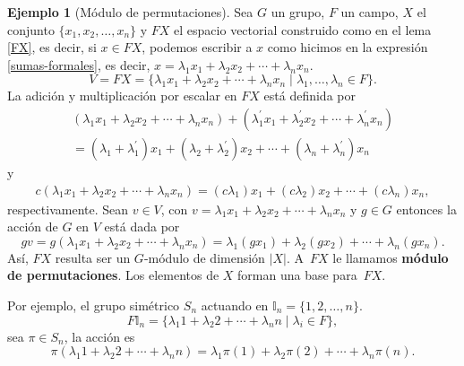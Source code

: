 \documentclass[12pt]{book}
\theoremstyle{definition}
\newtheorem{example}[theorem]{Ejemplo}
\newcounter{in}
\newcounter{ini}
\begin{document}
\begin{example}[Módulo de permutaciones]
  \label{CS}
  Sea $G$ un grupo, $F$ un campo, $X$ el conjunto $\{x_{1},x_{2},\ldots,x_{n}\}$ y $FX$ el
  espacio vectorial construido como en el lema \ref{FX}, es decir,
  si $x\in FX$, podemos escribir a $x$ como hicimos en la expresión
\ref{sumas-formales}, es decir,
$x=\lambda_{1}x_{1}+\lambda_{2}x_{2}+\cdots+\lambda_{n}x_{n}$.
  \begin{equation*}
    V=FX=\{\lambda_{1}x_{1}+\lambda_{2}x_{2}+\cdots
    +\lambda_{n}x_{n}\mid\lambda_{1},\ldots,\lambda_{n}\in F\}.
  \end{equation*}
  La adición y multiplicación por escalar
  en $FX$ está definida por
  \begin{eqnarray*}
    (\lambda_{1}x_{1}+\lambda_{2}x_{2}+\cdots
    +\lambda_{n}x_{n})+(\lambda^{'}_{1}x_{1}+\lambda^{'}_{2}x_{2}+\cdots +\lambda^{'}_{n}x_{n})\\
    =(\lambda_{1}+\lambda^{'}_{1})x_{1}+(\lambda_{2}+\lambda^{'}_{2})x_{2}+\cdots
    +(\lambda_{n}+\lambda^{'}_{n})x_{n}
  \end{eqnarray*}
  y
  \begin{eqnarray*}
    c(\lambda_{1}x_{1}+\lambda_{2}x_{2}+\cdots +\lambda_{n}x_{n})=(c\lambda_{1})x_{1}+(c\lambda_{2})x_{2}+\cdots +(c\lambda_{n})x_{n},
  \end{eqnarray*}
  respectivamente. Sean $v\in V$, con
  $v=\lambda_{1}x_{1}+\lambda_{2}x_{2}+\cdots+\lambda_{n}x_{n}$ y
  $g\in G$ entonces la acción de $G$ en $V$ está dada por
  \begin{equation*}
    gv=g(\lambda_{1}x_{1}+\lambda_{2}x_{2}+\cdots +\lambda_{n}x_{n})=\lambda_{1}(gx_{1})+\lambda_{2}(gx_{2})+\cdots +\lambda_{n}(gx_{n}).
  \end{equation*}
  Así, $FX$ resulta ser un $G$-módulo de dimensión $|X|$. A~$FX$ le llamamos
  \textbf{módulo de permutaciones}. Los elementos de $X$ forman una base para~$FX$.

  Por ejemplo, el grupo simétrico $S_{n}$ actuando en $\mathbb{I}_{n}=\{1,2,\ldots,n\}$.
  \begin{equation*}
    F\mathbb{I}_{n}=\{\lambda_{1}1+\lambda_{2}2+\cdots+\lambda_{n}n\mid
    \lambda_{i}\in F\},
  \end{equation*}
  sea $\pi\in S_{n}$, la acción es
  \begin{equation*}
    \pi(\lambda_{1}1+\lambda_{2}2+\cdots+\lambda_{n}n)=\lambda_{1}\pi(1)+\lambda_{2}\pi(2)+\cdots+\lambda_{n}\pi(n).
  \end{equation*}


\end{example}
\end{document}
